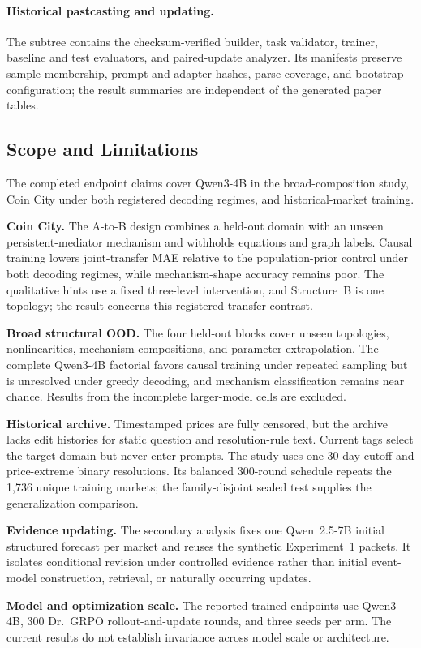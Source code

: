\paragraph{Historical pastcasting and updating.}
The  subtree contains the checksum-verified builder,
task validator, trainer, baseline and test evaluators, and paired-update analyzer.
Its manifests preserve sample membership, prompt and adapter hashes, parse
coverage, and bootstrap configuration; the result summaries are independent of
the generated paper tables.

\subsection{Scope and Limitations}
\label{app:exp3-limitations}

The completed endpoint claims cover Qwen3-4B in the broad-composition study,
Coin City under both registered decoding regimes, and historical-market
training.

\textbf{Coin City.} The A-to-B design combines a held-out domain with an unseen
persistent-mediator mechanism and withholds equations and graph labels. Causal
training lowers joint-transfer MAE relative to the population-prior control
under both decoding regimes, while mechanism-shape accuracy remains poor. The
qualitative hints use a fixed three-level intervention, and Structure~B is one
topology; the result concerns this registered transfer contrast.

\textbf{Broad structural OOD.} The four held-out blocks cover unseen topologies,
nonlinearities, mechanism compositions, and parameter extrapolation. The
complete Qwen3-4B factorial favors causal training under repeated sampling but
is unresolved under greedy decoding, and mechanism classification remains near
chance. Results from the incomplete larger-model cells are excluded.

\textbf{Historical archive.} Timestamped prices are fully censored, but the
archive lacks edit histories for static question and resolution-rule text.
Current tags select the target domain but never enter prompts. The study uses one
30-day cutoff and price-extreme binary resolutions. Its balanced 300-round
schedule repeats the 1,736 unique training markets; the family-disjoint sealed
test supplies the generalization comparison.

\textbf{Evidence updating.} The secondary analysis fixes one Qwen~2.5-7B
initial structured forecast per market and reuses the synthetic Experiment~1
packets. It isolates conditional revision under controlled evidence rather than
initial event-model construction, retrieval, or naturally occurring updates.

\textbf{Model and optimization scale.} The reported trained endpoints use
Qwen3-4B, 300 Dr.\ GRPO rollout-and-update rounds, and three seeds per arm. The
current results do not establish invariance across model scale or architecture.
